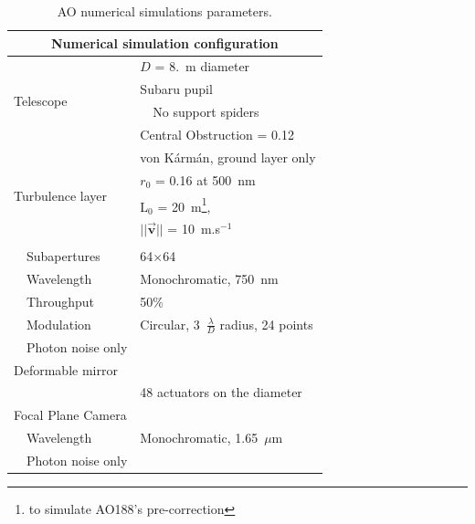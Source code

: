 \documentclass[twocolumn]{aa}
\begin{document}
\begin{table}[t]
		\centering
		\caption{%
			AO numerical simulations parameters.
		}
		\label{tab:simuParams}
		
		\renewcommand{\arraystretch}{1.2}
		\begin{tabular}{ll}
			\multicolumn{2}{c}{\textbf{Numerical simulation configuration}}\\
			\hline\hline
			\multirow{4}{*}{Telescope} & $D$ = 8.~m diameter\\
			& Subaru pupil \\
			& $\quad$No support spiders\\
			& Central Obstruction = 0.12 \\
			\hline
			\multirow{5}{*}{Turbulence layer} & von Kármán, ground layer only\\
			& $r_0$ = 0.16 at 500~nm \\ %
			& L$_0$ = 20~m\footnote{to simulate AO188's pre-correction}, \\
			& $||\overrightarrow{\mathbf{v}}||$ = 10~m.s$^{-1}$\\
			\hline
			PyWFS & \\
			$\quad$Subapertures & 64$\times$64 \\%
			$\quad$Wavelength & Monochromatic, 750~nm\\
			$\quad$Throughput & 50\% \\
			$\quad$Modulation & Circular, 3~$\frac{\lambda}{D}$ radius, 24 points\\
			$\quad$Photon noise only \\%
			\hline
			Deformable mirror & \\ 
			& 48 actuators on the diameter\\
			\hline
			Focal Plane Camera & \\
			$\quad$Wavelength & Monochromatic, 1.65~$\mu$m\\ 
			$\quad$Photon noise only \\

\end{tabular}
\end{table}
\end{document}
